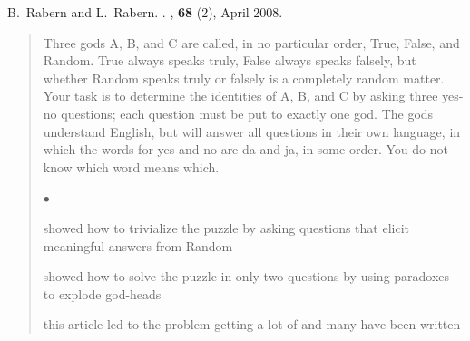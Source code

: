 \documentclass[10pt]{article}
\newcommand{\squishlist}{
   \begin{list}{$\bullet$}
    { \setlength{\itemsep}{0pt}    \setlength{\parsep}{0pt}
      \setlength{\topsep}{4.5pt}     \setlength{\partopsep}{0pt}
      \setlength{\leftmargin}{2em} \setlength{\labelwidth}{1.5em}
      \setlength{\labelsep}{0.5em} } }
\newcommand{\squishend}{
    \end{list}  }
\begin{document}
\vspace{0.5in}
{\large
B.~Rabern and L.~Rabern.
\newblock \href{http://brianrabern.net/sshlpe.pdf}{\color{blue}{A simple solution to the hardest logic puzzle ever}}. 
, \textbf{68} (2), April 2008.}

\begin{quote}
Three gods A, B, and C are called, in no particular order, True, False, and Random. 
True always speaks truly, False always speaks falsely, but whether Random speaks truly or falsely is a completely random matter. 
Your task is to determine the identities of A, B, and C by asking three yes-no questions; each question must be put to exactly one god. 
The gods understand English, but will answer all questions in their own language, in which the words for yes and no are da and ja, in some order. 
You do not know which word means which.
	  \squishlist
		\item showed how to trivialize the puzzle by asking questions that elicit meaningful answers from Random
		\item showed how to solve the puzzle in only two questions by using paradoxes to explode god-heads
		\item this article led to the problem getting a lot of \href{http://brianrabern.net/New_Scientist_HLPE.pdf}{\color{blue}{press}} 
		and many \href{https://scholar.google.com/scholar?oi=bibs&hl=en&cites=14941881349355280851}{\color{blue}{follow-up papers}} have been written
      \squishend
\end{quote}
\end{document}
